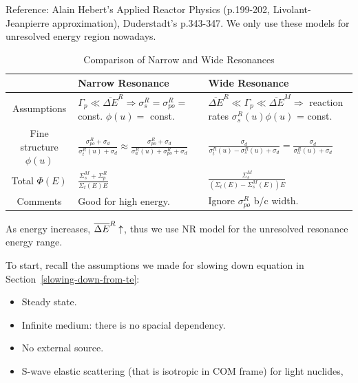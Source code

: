 \documentclass{school-22.211-notes}
\date{February 29, 2012}
\begin{document}
\maketitle



\clearpage
{}
Reference: Alain Hebert's Applied Reactor Physics (p.199-202, Livolant-Jeanpierre approximation), Duderstadt's p.343-347. We only use these models for unresolved energy region nowadays. 

\begin{table}[ht]
  \centering
  \begin{tabular}{|c|p{2in}|p{2.5in}|} \hline
     & Narrow Resonance & Wide Resonance  \\ \hline
    Assumptions & $\Gamma_p \ll \overline{\Delta E}^R \Rightarrow \sigma_s^R = \sigma_{po}^R = $const. $\phi(u)=$ const.  & $ \overline{\Delta E}^R \ll \Gamma_p \ll \overline{\Delta E}^M \Rightarrow$ reaction rates $\sigma_s^R(u) \phi(u)$ = const. \\ \hline
    Fine structure $\phi(u)$ & $\displaystyle \frac{\sigma_{po}^R + \sigma_d}{\sigma_{t}^R (u) + \sigma_d} \approx \frac{\sigma_{po}^R + \sigma_d}{\sigma_{a}^R(u) + \sigma_{po}^R + \sigma_d }$ &  $\displaystyle \frac{\sigma_d}{\sigma_{t}^R (u) - \sigma_{s}^R (u) + \sigma_d} = \frac{\sigma_d}{\sigma_{a}^R (u) +  \sigma_d }$   \\ \hline
    Total $\Phi (E)$ &  $\displaystyle\frac{\Sigma_s^M + \Sigma_p^R}{\Sigma_t(E) E}$  & $\displaystyle\frac{\Sigma_s^M}{(\Sigma_t(E) - \Sigma_s^M(E))E}$ \\ \hline 
    Comments & Good for high energy.   & Ignore $\sigma_{po}^R$ b/c width.  \\ \hline
  \end{tabular}
  \caption{Comparison of Narrow and Wide Resonances}
\end{table}
As energy increases, $\overline{\Delta E}^R \uparrow$, thus we use NR model for the unresolved resonance energy range. 

To start, recall the assumptions we made for slowing down equation in Section~\ref{slowing-down-from-te}: 
\begin{itemize}
\item Steady state.
\item Infinite medium: there is no spacial dependency. 
\item No external source. 
\item S-wave elastic scattering (that is isotropic in COM frame) for light nuclides, 
\end{itemize}
\end{document}
